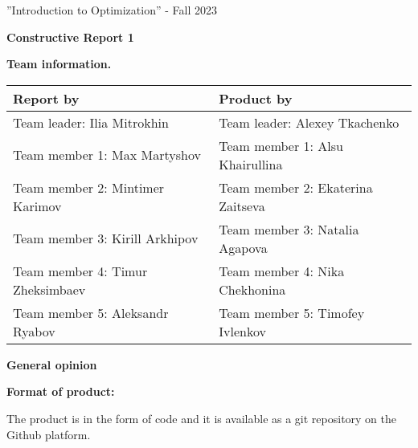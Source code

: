 \documentclass[12pt, legalpaper]{exam}
\newcommand{\course}{Introduction to Optimization}
\newcommand{\term}{Fall 2023}
\begin{document}
\noindent ''\course'' - \term



\noindent
{}




\vspace{12pt}
\begin{center}
    \textbf{Constructive Report 1}
\end{center}

\vspace{12pt}

\noindent  \textbf{Team information.}

\begin{table}[h!]
    \centering
    \begin{tabular}{|m{7cm}|m{7cm}|}\hline
        \textbf{Report by} & \textbf{Product by} \\ \hline
    Team leader: Ilia Mitrokhin & Team leader: Alexey Tkachenko\\ 
    Team member 1: Max Martyshov&
    Team member 1: Alsu Khairullina\\
    Team member 2: Mintimer Karimov&
    Team member 2: Ekaterina Zaitseva\\
    Team member 3: Kirill Arkhipov&   
    Team member 3: Natalia Agapova\\
    Team member 4: Timur Zheksimbaev&
    Team member 4: Nika Chekhonina\\
    Team member 5: Aleksandr Ryabov&
    Team member 5: Timofey Ivlenkov \\ \hline
    \end{tabular}
\end{table}



\vspace{12pt}



\noindent
{}
\noindent     \textbf{General opinion}

\vspace{12pt}
\textbf{Format of product:}

The product is in the form of code and it is available as a git repository on the Github platform.
\end{document}
